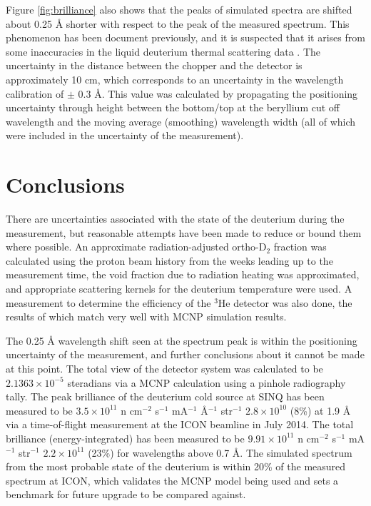 \documentclass[5p,12pt]{elsarticle}
\begin{document}
Figure \ref{fig:brilliance} also shows that the peaks of simulated spectra are shifted about 0.25 {\AA} shorter with respect to the peak of the measured spectrum.  This phenomenon has been document previously, and it is suspected that it arises from some inaccuracies in the liquid deuterium thermal scattering data \cite{giller_thesis}.  The uncertainty in the distance between the chopper and the detector is approximately 10 cm, which corresponds to an uncertainty in the wavelength calibration of $\pm$ 0.3 {\AA}.  This value was calculated by propagating the positioning uncertainty through height between the bottom/top at the beryllium cut off wavelength and the moving average (smoothing) wavelength width (all of which were included in the uncertainty of the measurement).  

%
%
%
%
%

\section{Conclusions}
\label{sec:conclusions}

There are uncertainties associated with the state of the deuterium during the measurement, but reasonable attempts have been made to reduce or bound them where possible.  An approximate radiation-adjusted ortho-D$_2$ fraction was calculated using the proton beam history from the weeks leading up to the measurement time, the void fraction due to radiation heating was approximated, and appropriate scattering kernels for the deuterium temperature were used.  A measurement to determine the efficiency of the $^3$He detector was also done, the results of which match very well with MCNP simulation results.

The 0.25 {\AA} wavelength shift seen at the spectrum peak is within the positioning uncertainty of the measurement, and further conclusions about it cannot be made at this point.  The total view of the detector system was calculated to be $2.1363\times10^{-5}$ steradians via a MCNP calculation using a pinhole radiography tally.  The peak brilliance of the deuterium cold source at SINQ has been measured to be $3.5\times10^{11}$ n cm$^{-2}$ s$^{-1}$ mA$^{-1}$ \AA$^{-1}$ str$^{-1}$  \pm $2.8\times10^{10}$ (8\%) at 1.9 {\AA} via a time-of-flight measurement at the ICON beamline in July 2014.  The total brilliance (energy-integrated) has been measured to be  $9.91\times10^{11}$  n cm$^{-2}$ s$^{-1}$ mA$^{-1}$ str$^{-1}$ \pm $2.2\times10^{11}$ (23\%) for wavelengths above 0.7 {\AA}.  The simulated spectrum from the most probable state of the deuterium is within 20\% of the measured spectrum at ICON, which validates the MCNP model being used and sets a benchmark for future upgrade to be compared against.  
\end{document}
